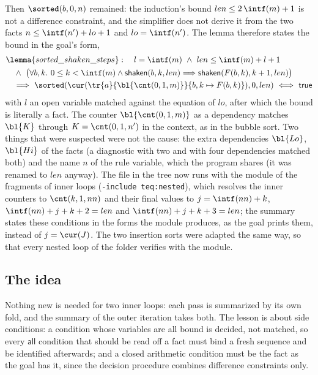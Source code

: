 Then $\sorted(b, 0, n)$ remained: the induction's bound $len \le 2\,\intf(m) + 1$ is not a difference
constraint, and the simplifier does not derive it from the two facts $n \le \intf(n') + lo + 1$ and
$lo = \intf(n')$. The lemma therefore states the bound in the goal's form,
\begin{align*}
  &\lemma{sorted\_shaken\_steps}:\quad l = \intf(m)\ \wedge\ len \le \intf(m) + l + 1\\
  &\quad\wedge\ \big(\forall b, k.\ 0 \le k < \intf(m) \wedge \mathsf{shaken}(b, k, len) \Longrightarrow \mathsf{shaken}(F(b, k), k + 1, len)\big)\\
  &\quad\Longrightarrow\ \sorted(\cur(\tr{a}{\bl{\cnt(0, 1, m)}}{b, k \mapsto F(b, k)}), 0, len)\ \Longleftrightarrow\ \mathsf{true}
\end{align*}
with $l$ an open variable matched against the equation of $lo$, after which the bound is literally a fact.
The counter $\bl{\cnt(0, 1, m)}$ as a dependency matches $\bl{K}$ through $K = \cnt(0, 1, n')$ in the
context, as in the bubble sort. Two things that were suspected were not the cause: the extra dependencies
$\bl{Lo}$, $\bl{Hi}$ of the facts (a diagnostic with two and with four dependencies matched both) and the
name $n$ of the rule variable, which the program shares (it was renamed to $len$ anyway). The file in the
tree now runs with the module of the fragments of inner loops (\texttt{-include teq:nested}), which resolves
the inner counters to $\cnt(k, 1, nn)$ and their final values to $j = \intf(nn) + k$,
$\intf(nn) + j + k + 2 = len$ and $\intf(nn) + j + k + 3 = len$; the summary states these conditions in the
forms the module produces, as the goal prints them, instead of $j = \cur(J)$. The two insertion sorts were
adapted the same way, so that every nested loop of the folder verifies with the module.

\subsection{The idea}
Nothing new is needed for two inner loops: each pass is summarized by its own fold, and the summary of
the outer iteration takes both. The lesson is about side conditions: a condition whose variables are all
bound is decided, not matched, so every $\mathsf{all}$ condition that should be read off a fact must bind a
fresh sequence and be identified afterwards; and a closed arithmetic condition must be the fact as the goal
has it, since the decision procedure combines difference constraints only.
